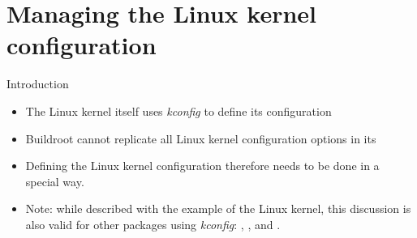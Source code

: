 \section{Managing the Linux kernel configuration}

\begin{frame}{Introduction}
  \begin{itemize}
  \item The Linux kernel itself uses {\em kconfig} to define its
    configuration
  \item Buildroot cannot replicate all Linux kernel configuration
    options in its 
  \item Defining the Linux kernel configuration therefore needs to be
    done in a special way.
  \item Note: while described with the example of the Linux kernel,
    this discussion is also valid for other packages using {\em
      kconfig}: , ,  and
    .
  \end{itemize}
\end{frame}

